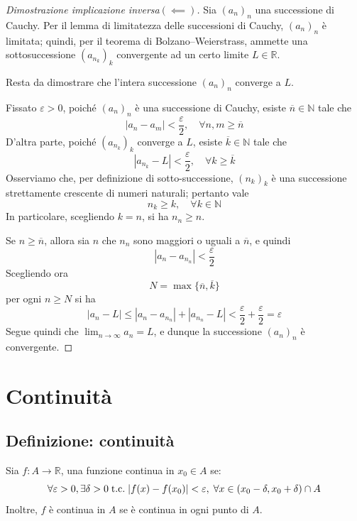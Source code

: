 \documentclass[a4paper,12pt,openright]{book}
\begin{document}
	\begin{proof}[Dimostrazione implicazione inversa$(\impliedby)$]
		Sia $(a_n)_n$ una successione di Cauchy. Per il lemma di limitatezza delle successioni di Cauchy, $(a_n)_n$ è limitata; quindi, per il teorema di Bolzano--Weierstrass, ammette una sottosuccessione $(a_{n_k})_k$ convergente ad un certo limite $L \in \mathbb{R}$.
		
		Resta da dimostrare che l'intera successione $(a_n)_n$ converge a $L$.
		
		Fissato $\varepsilon > 0$, poiché $(a_n)_n$ è una successione di Cauchy, esiste $\overline{n} \in \mathbb{N}$ tale che
		\[|a_n - a_m| < \frac{\varepsilon}{2}, \quad \forall n,m \ge \overline{n}\]
		D'altra parte, poiché $(a_{n_k})_k$ converge a $L$, esiste $\overline{k} \in \mathbb{N}$ tale che
		\[|a_{n_k} - L| < \frac{\varepsilon}{2}, \quad \forall k \ge \overline{k}\]
		Osserviamo che, per definizione di sotto-successione, $(n_k)_k$ è una successione strettamente crescente di numeri naturali; pertanto vale
		\[n_k \ge k, \quad \forall k \in \mathbb{N}\]
		In particolare, scegliendo $k = n$, si ha $n_n \ge n$.

		Se $n \ge \overline{n}$, allora sia $n$ che $n_n$ sono maggiori o uguali a $\overline{n}$, e quindi
		\[|a_n - a_{n_n}| < \frac{\varepsilon}{2}\]			
		Scegliendo ora
		\[N = \max\{\overline{n}, \overline{k}\}\]
		per ogni $n \ge N$ si ha
		\[|a_n - L| \le |a_n - a_{n_n}| + |a_{n_n} - L|	< \frac{\varepsilon}{2} + \frac{\varepsilon}{2}	= \varepsilon\]
		Segue quindi che $\lim_{n \to \infty} a_n = L$, e dunque la successione $(a_n)_n$ è convergente.
	\end{proof}

    \chapter{Continuità}
    \section{Definizione: continuità}
    Sia $f: A \longrightarrow \mathbb{R}$, una funzione continua in $x_0 \in A$ se:
    \[\forall \varepsilon > 0, \exists \delta > 0 \;\text{t.c.}\; |f(x) - f(x_0)| < \varepsilon, \; \forall x \in (x_0 - \delta, x_0 + \delta) \cap A\]
    Inoltre, $f$ è continua in $A$ se è continua in ogni punto di $A$.
    
\end{document}
